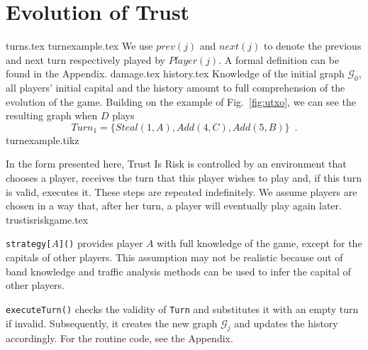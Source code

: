 \section{Evolution of Trust}
  {turns.tex}
  {turnexample.tex}
  We use $prev\left(j\right)$ and $next\left(j\right)$ to denote the previous and next turn respectively played by
  $Player(j)$. A formal definition can be found in the Appendix.
  {damage.tex}
  {history.tex}
  \noindent Knowledge of the initial graph $\mathcal{G}_0$, all players' initial capital and the history amount to full
  comprehension of the evolution of the game. Building on the example of Fig.~\ref{fig:utxo}, we can see the resulting graph
  when $D$ plays
  \begin{equation}
  \label{turnexample}
    Turn_1 = \{Steal\left(1, A\right), Add\left(4, C\right), Add\left(5, B\right)\} \enspace.
  \end{equation}
  {turnexample.tikz}

  \noindent In the form presented here, Trust Is Risk is controlled by an environment that chooses a player, receives the turn
  that this player wishes to play and, if this turn is valid, executes it. These steps are repeated indefinitely. We assume
  players are chosen in a way that, after her turn, a player will eventually play again later.
  {trustisriskgame.tex}

  \noindent \texttt{strategy[}$A$\texttt{]()} provides player $A$ with full knowledge of the game, except for the capitals of
  other players. This assumption may not be realistic because out of band knowledge and traffic analysis methods can be used
  to infer the capital of other players.

  \texttt{executeTurn()} checks the validity of \texttt{Turn} and substitutes it with an empty turn if invalid.
  Subsequently, it creates the new graph $\mathcal{G}_j$ and updates the history accordingly. For the routine code,
  see the Appendix.
